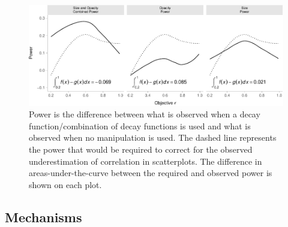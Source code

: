\documentclass[manuscript, review, anonymous, screen]{acmart}
\begin{document}
\begin{figure}

{\centering \includegraphics[width=1\textwidth,height=\textheight]{size_and_opacity_files/figure-pdf/fig-power-plot-1.pdf}

}

\caption{\label{fig-power-plot}Power is the difference between what is
observed when a decay function/combination of decay functions is used
and what is observed when no manipulation is used. The dashed line
represents the power that would be required to correct for the observed
underestimation of correlation in scatterplots. The difference in
areas-under-the-curve between the required and observed power is shown
on each plot.}

\end{figure}

\hypertarget{sec-mechs}{%
\subsection{Mechanisms}\label{sec-mechs}}
\end{document}
